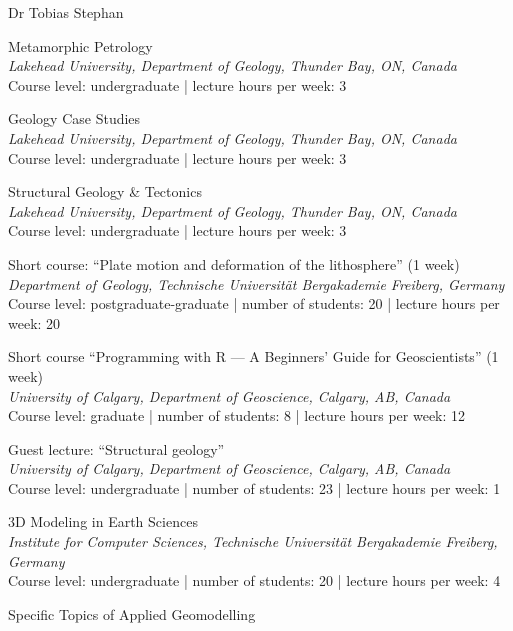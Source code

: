 \documentclass[10pt, paper=letter]{scrartcl} %
\begin{document}
\begin{cv}{\textcolor{myred}{\textsf{Dr Tobias Stephan}}}
    \begin{cvlist}{}
        \item[since 2026] Metamorphic Petrology\\
        \textit{Lakehead University, Department of Geology, Thunder Bay, ON, Canada}\\
        Course level: undergraduate | lecture hours per week: 3
        \item[since 2025] Geology Case Studies\\
        \textit{Lakehead University, Department of Geology, Thunder Bay, ON, Canada}\\
        Course level: undergraduate | lecture hours per week: 3
        \item[since 2025] Structural Geology \& Tectonics\\
        \textit{Lakehead University, Department of Geology, Thunder Bay, ON, Canada}\\
        Course level: undergraduate |  lecture hours per week: 3
        \item[2023/10] Short course: \enquote{Plate motion and deformation of the lithosphere} (1 week)\\
        \textit{Department of Geology, Technische Universit\"at Bergakademie Freiberg, Germany}
        Course level: postgraduate-graduate | number of students: 20 | lecture hours per week: 20
        \item[2022/09] Short course \enquote{Programming with R --- A Beginners’ Guide for Geoscientists} (1 week)\\
        \textit{University of Calgary, Department of Geoscience, Calgary, AB, Canada}\\
        Course level: graduate | number of students: 8 | lecture hours per week: 12
        \item[2022/01] Guest lecture: \enquote{Structural geology}\\
        \textit{University of Calgary, Department of Geoscience, Calgary, AB, Canada}\\
        Course level: undergraduate | number of students: 23 | lecture hours per week: 1
        \item[2019/09--2019/12] 3D Modeling in Earth Sciences\\
        \textit{Institute for Computer Sciences, Technische Universit\"at Bergakademie Freiberg, Germany}\\
        Course level: undergraduate | number of students: 20 | lecture hours per week: 4
        \item[2017/10--2018/03] Specific Topics of Applied Geomodelling\\

\end{cvlist}
\end{cv}
\end{document}
